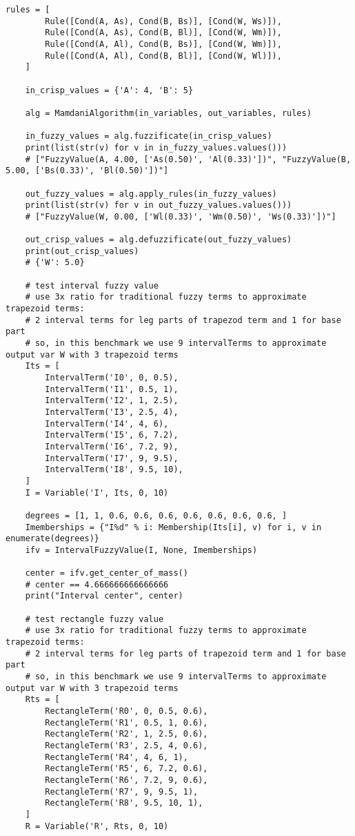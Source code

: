 \begin{lstlisting}[style=pythonstyle,caption={ }, label=lst:func:1]
	rules = [
		Rule([Cond(A, As), Cond(B, Bs)], [Cond(W, Ws)]),
		Rule([Cond(A, As), Cond(B, Bl)], [Cond(W, Wm)]),
		Rule([Cond(A, Al), Cond(B, Bs)], [Cond(W, Wm)]),
		Rule([Cond(A, Al), Cond(B, Bl)], [Cond(W, Wl)]),
	]

	in_crisp_values = {'A': 4, 'B': 5}

	alg = MamdaniAlgorithm(in_variables, out_variables, rules)

	in_fuzzy_values = alg.fuzzificate(in_crisp_values)
	print(list(str(v) for v in in_fuzzy_values.values()))
	# ["FuzzyValue(A, 4.00, ['As(0.50)', 'Al(0.33)'])", "FuzzyValue(B, 5.00, ['Bs(0.33)', 'Bl(0.50)'])"]

	out_fuzzy_values = alg.apply_rules(in_fuzzy_values)
	print(list(str(v) for v in out_fuzzy_values.values()))
	# ["FuzzyValue(W, 0.00, ['Wl(0.33)', 'Wm(0.50)', 'Ws(0.33)'])"]

	out_crisp_values = alg.defuzzificate(out_fuzzy_values)
	print(out_crisp_values)
	# {'W': 5.0}

	# test interval fuzzy value
	# use 3x ratio for traditional fuzzy terms to approximate trapezoid terms:
	# 2 interval terms for leg parts of trapezod term and 1 for base part
	# so, in this benchmark we use 9 intervalTerms to approximate output var W with 3 trapezoid terms
	Its = [
		IntervalTerm('I0', 0, 0.5),
		IntervalTerm('I1', 0.5, 1),
		IntervalTerm('I2', 1, 2.5),
		IntervalTerm('I3', 2.5, 4),
		IntervalTerm('I4', 4, 6),
		IntervalTerm('I5', 6, 7.2),
		IntervalTerm('I6', 7.2, 9),
		IntervalTerm('I7', 9, 9.5),
		IntervalTerm('I8', 9.5, 10),
	]
	I = Variable('I', Its, 0, 10)

	degrees = [1, 1, 0.6, 0.6, 0.6, 0.6, 0.6, 0.6, 0.6, ]
	Imemberships = {"I%d" % i: Membership(Its[i], v) for i, v in enumerate(degrees)}
	ifv = IntervalFuzzyValue(I, None, Imemberships)

	center = ifv.get_center_of_mass()
	# center == 4.666666666666666
	print("Interval center", center)

	# test rectangle fuzzy value
	# use 3x ratio for traditional fuzzy terms to approximate trapezoid terms:
	# 2 interval terms for leg parts of trapezoid term and 1 for base part
	# so, in this benchmark we use 9 intervalTerms to approximate output var W with 3 trapezoid terms
	Rts = [
		RectangleTerm('R0', 0, 0.5, 0.6),
		RectangleTerm('R1', 0.5, 1, 0.6),
		RectangleTerm('R2', 1, 2.5, 0.6),
		RectangleTerm('R3', 2.5, 4, 0.6),
		RectangleTerm('R4', 4, 6, 1),
		RectangleTerm('R5', 6, 7.2, 0.6),
		RectangleTerm('R6', 7.2, 9, 0.6),
		RectangleTerm('R7', 9, 9.5, 1),
		RectangleTerm('R8', 9.5, 10, 1),
	]
	R = Variable('R', Rts, 0, 10)


\end{lstlisting}
